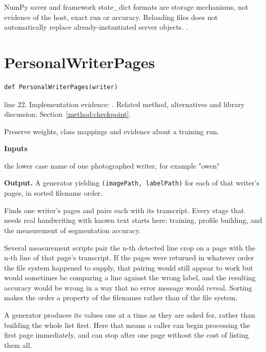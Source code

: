 NumPy savez and framework state\_dict formats are storage mechanisms, not evidence of the host, exact run or accuracy. Reloading files does not automatically replace already-instantiated server objects. \cite{code2026,numpysavez}.


\section{PersonalWriterPages}\label{fn:paths:PersonalWriterPages}
\begin{lstlisting}[style=sig]
def PersonalWriterPages(writer)
\end{lstlisting}
 line 22. Implementation evidence: \cite{code2026}. Related method, alternatives and library discussion: Section~\ref{method:checkpoint}.


Preserve weights, class mappings and evidence about a training run.




\noindent\textbf{Inputs}
\begin{description}[leftmargin=2.2em,style=nextline,font=\normalfont\ttfamily]\setlength\itemsep{1pt}
  \item[{writer}] \normalfont the lower case name of one photographed writer, for example "owen"
\end{description}

\noindent\textbf{Output.} A generator yielding \texttt{(imagePath, labelPath)} for each of that writer's pages, in sorted filename order.


Finds one writer's pages and pairs each with its transcript. Every stage that needs real handwriting with known text starts here: training, profile building, and the measurement of segmentation accuracy.


Several measurement scripts pair the n-th detected line crop on a page with the n-th line of that page's transcript. If the pages were returned in whatever order the file system happened to supply, that pairing would still appear to work but would sometimes be comparing a line against the wrong label, and the resulting accuracy would be wrong in a way that no error message would reveal. Sorting makes the order a property of the filenames rather than of the file system.


A generator produces its values one at a time as they are asked for, rather than building the whole list first. Here that means a caller can begin processing the first page immediately, and can stop after one page without the cost of listing them all.

